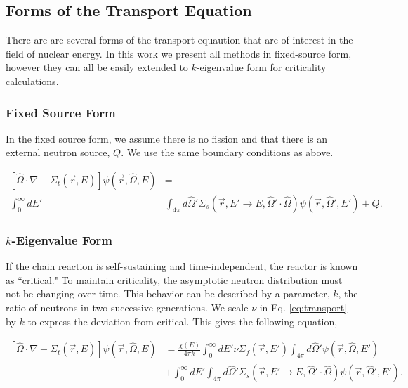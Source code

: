 \subsection{Forms of the Transport Equation}
There are are several forms of the transport equaution that are of interest in the field of nuclear energy. In this work we present all methods in fixed-source form, however they can all be easily extended to $k$-eigenvalue form for criticality calculations. 

\subsubsection{Fixed Source Form}
In the fixed source form, we assume there is no fission and that there is an external neutron source, $Q$. We use the same boundary conditions as above. 

\begin{equation}
\begin{split}
 [\hat{\Omega} \cdot \nabla + \Sigma_t(\vec{r}, E)]\psi(\vec{r}, \hat{\Omega}, E) &= \\ \int_0^\infty dE' &\int_{4\pi} d\hat{\Omega}' \Sigma_s(\vec{r}, E' \rightarrow E, \hat{\Omega}' \cdot \hat{\Omega})\psi(\vec{r}, \hat{\Omega}', E')  + Q.
\end{split}
 \label{eq:transport_fixed_source}
\end{equation}

\subsubsection{$k$-Eigenvalue Form}
If the chain reaction is self-sustaining and time-independent, the reactor is known as ``critical." To maintain criticality, the asymptotic neutron distribution must not be changing over time. This behavior can be described by a parameter,  $k$, the ratio of neutrons in two successive generations. We scale $\nu$ in Eq. \eqref{eq:transport} by $k$ to express the deviation from critical. This gives the following equation,

\begin{equation}
    \label{eq:transport_eigenvalue}
    \begin{split}
        [\hat{\Omega} \cdot \nabla + \Sigma_t(\vec{r}, E)]\psi(\vec{r}, \hat{\Omega}, E) &= \frac{\chi(E)}{4\pi k} \int_0^\infty dE' \nu \Sigma_{f}(\vec{r}, E') \int_{4\pi} d\hat{\Omega}'\psi(\vec{r}, \hat{\Omega}, E') \\ &+ \int_0^\infty dE' \int_{4\pi} d\hat{\Omega}' \Sigma_s(\vec{r}, E' \rightarrow E, \hat{\Omega}' \cdot \hat{\Omega})\psi(\vec{r}, \hat{\Omega}', E').
    \end{split}
\end{equation}

